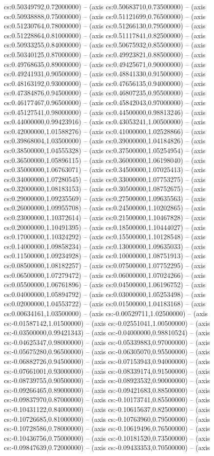 cs:0.50349792,0.72000000) -- (axis cs:0.50683710,0.73500000) -- (axis cs:0.50938888,0.75000000) -- (axis cs:0.51121699,0.76500000) -- (axis cs:0.51230764,0.78000000) -- (axis cs:0.51266130,0.79500000) -- (axis cs:0.51228864,0.81000000) -- (axis cs:0.51117841,0.82500000) -- (axis cs:0.50933255,0.84000000) -- (axis cs:0.50675932,0.85500000) -- (axis cs:0.50340125,0.87000000) -- (axis cs:0.49923821,0.88500000) -- (axis cs:0.49768635,0.89000000) -- (axis cs:0.49425671,0.90000000) -- (axis cs:0.49241931,0.90500000) -- (axis cs:0.48841330,0.91500000) -- (axis cs:0.48163192,0.93000000) -- (axis cs:0.47656135,0.94000000) -- (axis cs:0.47384876,0.94500000) -- (axis cs:0.46807235,0.95500000) -- (axis cs:0.46177467,0.96500000) -- (axis cs:0.45842043,0.97000000) -- (axis cs:0.45127541,0.98000000) -- (axis cs:0.44500000,0.98813246) -- (axis cs:0.44000000,0.99423916) -- (axis cs:0.43053241,1.00500000) -- (axis cs:0.42000000,1.01588276) -- (axis cs:0.41000000,1.02528866) -- (axis cs:0.39868004,1.03500000) -- (axis cs:0.39000000,1.04184826) -- (axis cs:0.38500000,1.04555328) -- (axis cs:0.37500000,1.05254954) -- (axis cs:0.36500000,1.05896115) -- (axis cs:0.36000000,1.06198040) -- (axis cs:0.35000000,1.06763071) -- (axis cs:0.34500000,1.07025413) -- (axis cs:0.34000000,1.07280545) -- (axis cs:0.33000000,1.07753275) -- (axis cs:0.32000000,1.08183153) -- (axis cs:0.30500000,1.08752675) -- (axis cs:0.29000000,1.09235569) -- (axis cs:0.27500000,1.09635563) -- (axis cs:0.26000000,1.09955708) -- (axis cs:0.24500000,1.10202865) -- (axis cs:0.23000000,1.10372614) -- (axis cs:0.21500000,1.10467828) -- (axis cs:0.20000000,1.10491395) -- (axis cs:0.18500000,1.10444027) -- (axis cs:0.17000000,1.10324292) -- (axis cs:0.15500000,1.10128548) -- (axis cs:0.14000000,1.09858234) -- (axis cs:0.13000000,1.09635033) -- (axis cs:0.11500000,1.09234928) -- (axis cs:0.10000000,1.08751913) -- (axis cs:0.08500000,1.08182257) -- (axis cs:0.07500000,1.07752295) -- (axis cs:0.06500000,1.07279472) -- (axis cs:0.06000000,1.07024266) -- (axis cs:0.05500000,1.06761896) -- (axis cs:0.04500000,1.06196752) -- (axis cs:0.04000000,1.05894792) -- (axis cs:0.03000000,1.05253498) -- (axis cs:0.02000000,1.04553722) -- (axis cs:0.01500000,1.04183168) -- (axis cs:0.00634161,1.03500000) -- (axis cs:-0.00529711,1.02500000) -- (axis cs:-0.01587142,1.01500000) -- (axis cs:-0.02551041,1.00500000) -- (axis cs:-0.03500000,0.99421343) -- (axis cs:-0.04000000,0.98810524) -- (axis cs:-0.04625347,0.98000000) -- (axis cs:-0.05339883,0.97000000) -- (axis cs:-0.05675280,0.96500000) -- (axis cs:-0.06305070,0.95500000) -- (axis cs:-0.06882726,0.94500000) -- (axis cs:-0.07153943,0.94000000) -- (axis cs:-0.07661001,0.93000000) -- (axis cs:-0.08339174,0.91500000) -- (axis cs:-0.08739755,0.90500000) -- (axis cs:-0.08923532,0.90000000) -- (axis cs:-0.09266465,0.89000000) -- (axis cs:-0.09421683,0.88500000) -- (axis cs:-0.09837970,0.87000000) -- (axis cs:-0.10173741,0.85500000) -- (axis cs:-0.10431122,0.84000000) -- (axis cs:-0.10615637,0.82500000) -- (axis cs:-0.10726685,0.81000000) -- (axis cs:-0.10763960,0.79500000) -- (axis cs:-0.10728586,0.78000000) -- (axis cs:-0.10619496,0.76500000) -- (axis cs:-0.10436756,0.75000000) -- (axis cs:-0.10181520,0.73500000) -- (axis cs:-0.09847639,0.72000000) -- (axis cs:-0.09433353,0.70500000) -- (axis 